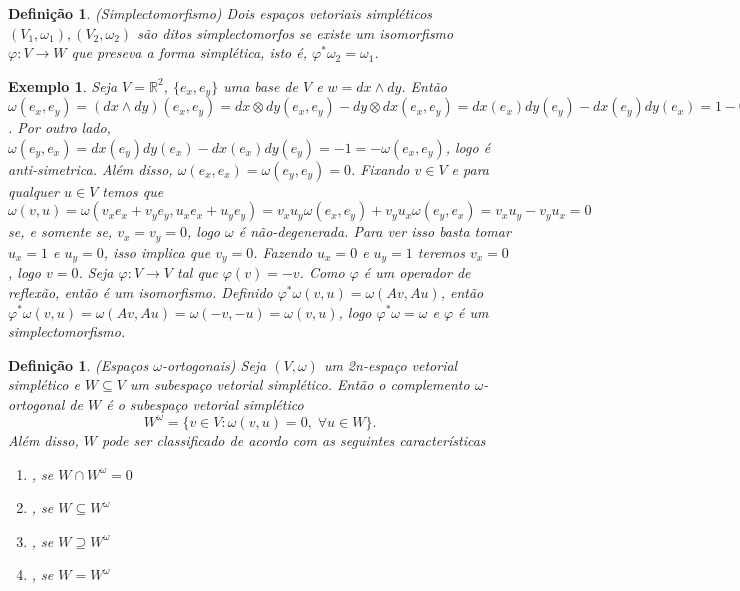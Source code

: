 \documentclass[12pt]{book}
\newtheorem{definicao}[teorema]{Definição}
\newtheorem{exemplo}[teorema]{Exemplo}
\newcommand{\espacoSimpleticoOrtogonal}[1]{#1^{\omega}}
\newcommand{\real}[1]{\mathbb{R}^{#1}}
\begin{document}
	\begin{definicao}
		(Simplectomorfismo) Dois espaços vetoriais simpléticos $(V_{1}, \omega_{1}), (V_{2}, \omega_{2})$ são ditos simplectomorfos se existe um isomorfismo $\varphi:V\to W$ que preseva a forma simplética, isto é, $\varphi^{*}\omega_{2} = \omega_{1}$.
	\end{definicao}
	\begin{exemplo}
		Seja $V = \real{2}$, $\{e_{x}, e_{y}\}$ uma base de $V$ e $w=dx \wedge dy$. Então $\omega(e_{x}, e_{y}) = (dx \wedge dy)(e_{x}, e_{y}) = dx\otimes dy(e_{x}, e_{y})-dy\otimes dx(e_{x}, e_{y}) =dx(e_{x}) dy(e_{y}) - dx(e_{y}) dy(e_{x}) = 1-0= 1$. Por outro lado, $\omega(e_{y}, e_{x}) =dx(e_{y}) dy(e_{x}) - dx(e_{x}) dy(e_{y}) =-1 =-\omega(e_{x}, e_{y})$, logo é anti-simetrica. Além disso, $\omega(e_{x}, e_{x}) = \omega(e_{y}, e_{y}) = 0$. Fixando $v \in V$ e para qualquer $u \in V$ temos que $\omega(v, u) = \omega(v_{x}e_{x}+v_{y}e_{y}, u_{x}e_{x}+u_{y}e_{y}) = v_{x}u_{y}\omega(e_{x}, e_{y}) +v_{y}u_{x}\omega(e_{y}, e_{x}) = v_{x}u_{y} -v_{y}u_{x} = 0$ se, e somente se, $v_{x}=v_{y}=0$, logo $\omega$ é não-degenerada. Para ver isso basta tomar $u_{x} = 1$ e $u_{y} = 0$, isso implica que $v_{y} = 0$. Fazendo $u_{x} = 0$ e $u_{y} = 1$ teremos $v_{x} = 0$, logo $v=0$. Seja $\varphi:V \to V$ tal que $\varphi(v) = -v$. Como $\varphi$ é um operador de reflexão, então é um isomorfismo. Definido $\varphi^{*}\omega(v, u) = \omega(Av, Au)$, então $\varphi^{*}\omega(v, u) = \omega(Av, Au)=\omega(-v, -u)=\omega(v, u)$, logo $\varphi^{*}\omega = \omega$ e $\varphi$ é um simplectomorfismo.
	\end{exemplo}
	
	\begin{definicao}\label{definicao_subespaco_simpletico_ortogonais}
		(Espaços $\omega$-ortogonais) Seja $(V, \omega)$ um 2n-espaço vetorial simplético e $W\subseteq V$ um subespaço vetorial simplético. Então o complemento $\omega$-ortogonal de $W$ é o subespaço vetorial simplético
		$$
		W^{\omega} = \{v\in V: \omega(v,u) = 0,\;\forall u\in W \}.
		$$
		Além disso, $W$ pode ser classificado de acordo com as seguintes características
		\begin{enumerate}
			\item {}, se $W\cap \espacoSimpleticoOrtogonal{W} = 0$
			\item {}, se $W \subseteq \espacoSimpleticoOrtogonal{W}$
			\item {}, se $W\supseteq \espacoSimpleticoOrtogonal{W}$
			\item {}, se $W =\espacoSimpleticoOrtogonal{W}$
		\end{enumerate}
	\end{definicao}
	
\end{document}
